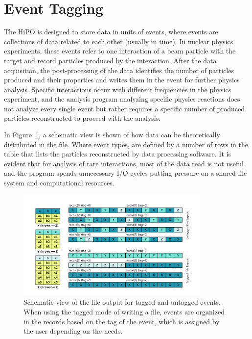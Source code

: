 \section{Event Tagging}

The HiPO is designed to store data in units of events, where events are collections of data related to each other (usually in time). In nuclear physics
experiments, these events refer to one interaction of a beam particle with the target and record particles produced by the interaction. After the data 
acquisition, the post-processing of the data identifies the number of particles produced and their properties and writes them in the event for further
physics analysis. Specific interactions occur with different frequencies in the physics experiment, and the analysis program analyzing specific physics 
reactions does not analyze every single event but rather requires a specific number of produced particles reconstructed to proceed with the analysis.

In Figure~\ref {fig:event_frequency}, a schematic view is shown of how data can be theoretically distributed in the file. Where event types, are defined by 
a number of rows in the table that lists the particles reconstructed by data processing software. It is evident that for analysis of rare interactions, most of
the data read is not useful and the program spends unnecessary I/O cycles putting pressure on a shared file system and computational resources.

\begin{figure}[h!]
  \begin{center}
    \includegraphics[width=0.85\textwidth]{images/tagged_records.pdf}
 \end{center}
  \caption{Schematic view of the file output for tagged and untagged events. When using the tagged mode of writing a file, events are organized in the records 
  based on the tag of the event, which is assigned by the user depending on the needs.}
 \label{fig:event_frequency}
\end{figure}

